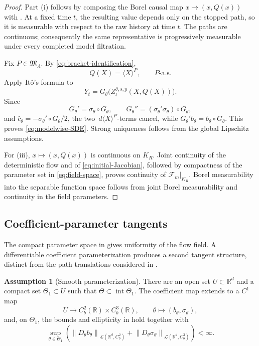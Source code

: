 \documentclass[11pt,reqno]{amsart}
\theoremstyle{plain}
\theoremstyle{definition}
\newtheorem{assumption}[assumption]{Assumption}
\newcommand{\R}{\mathbb R}
\newcommand{\dd}{\,d}
\newcommand{\norm}[1]{\left\lVert #1\right\rVert}
\begin{document}
\begin{proof}
Part (i) follows by composing the Borel causal map \(x\mapsto(x,Q(x))\) with
.  At a fixed time \(t\), the resulting
value depends only on the stopped path, so it is measurable with respect to
the raw history at time \(t\).  The paths are continuous; consequently the
same representative is progressively measurable under every completed
model filtration.

Fix \(P\in\mathfrak M_\Lambda\).  By
\eqref{eq:bracket-identification},
\[
  Q(X)=\langle X\rangle^P,
  \qquad P\text{-a.s.}
\]
Apply It\^o's formula to
\[
  Y_t=G_\theta\bigl(Z_t^{\theta,s,y}(X,Q(X))\bigr).
\]
Since
\[
  G_\theta'=\sigma_\theta\circ G_\theta,
  \qquad
  G_\theta''
  =(\sigma_\theta'\sigma_\theta)\circ G_\theta,
\]
and \(\widehat c_\theta=-\sigma_\theta'\circ G_\theta/2\), the two
\(\dd\langle X\rangle^P\)-terms cancel, while
\(G_\theta'\widehat b_\theta=b_\theta\circ G_\theta\).  This proves
\eqref{eq:modelwise-SDE}.  Strong uniqueness follows from the global
Lipschitz assumptions.

For (iii), \(x\mapsto(x,Q(x))\) is continuous on \(K_R\).  Joint continuity
of the deterministic flow and of \eqref{eq:initial-Jacobian}, followed by
compactness of the parameter set in \eqref{eq:field-space}, proves
continuity of \(\mathscr F_m|_{K_R}\).  Borel measurability into the
separable function space follows from joint Borel measurability and
continuity in the field parameters.
\end{proof}

\subsection{Coefficient-parameter tangents}

The compact parameter space in  gives uniformity of
the flow field.  A differentiable coefficient parameterization produces a
second tangent structure, distinct from the path translations considered in
.

\begin{assumption}[Smooth parameterization]\label{ass:parametric}
There are an open set \(U\subset\R^d\) and a compact set
\(\Theta_1\subset U\) such that
\(\Theta\subset\operatorname{int}\Theta_1\).  The coefficient map extends
to a \(C^1\) map
\[
  U\longrightarrow C_b^2(\R)\times C_b^3(\R),
  \qquad
  \theta\longmapsto(b_\theta,\sigma_\theta),
\]
and, on \(\Theta_1\), the bounds and ellipticity in
 hold together with
\[
  \sup_{\theta\in\Theta_1}
  \left(
    \norm{D_\theta b_\theta}_{\mathcal L(\R^d,C_b^2)}
    +\norm{D_\theta\sigma_\theta}_{\mathcal L(\R^d,C_b^3)}
  \right)<\infty.
\]
\end{assumption}
\end{document}
